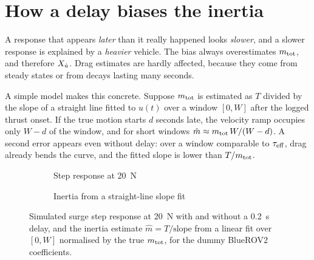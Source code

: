 \section{How a delay biases the inertia}

A response that appears \emph{later} than it really happened looks \emph{slower}, and a slower
response is explained by a \emph{heavier} vehicle. The bias always overestimates $m_\mathrm{tot}$, and
therefore $X_{\dot u}$. Drag estimates are hardly affected, because they come from steady states or
from decays lasting many seconds.

A simple model makes this concrete. Suppose $m_\mathrm{tot}$ is estimated as $T$ divided by the slope
of a straight line fitted to $u(t)$ over a window $[0, W]$ after the logged thrust onset. If
the true motion starts $d$ seconds late, the velocity ramp occupies only $W - d$ of the
window, and for short windows $\hat m \approx m_\mathrm{tot}\,W/(W-d)$. A second error appears even
without delay: over a window comparable to $\tau_\mathrm{eff}$, drag already bends the curve, and the
fitted slope is lower than $T/m_\mathrm{tot}$.

\begin{figure}[htbp]
\centering
\begin{subfigure}{0.48\textwidth}
\centering
{}
\caption{Step response at \qty{20}{\newton}}
\end{subfigure}\hfill
\begin{subfigure}{0.48\textwidth}
\centering
{}
\caption{Inertia from a straight-line slope fit}
\end{subfigure}
\caption{Simulated surge step response at \qty{20}{\newton} with and without a
\qty{0.2}{\second} delay, and the inertia estimate $\hat m = T/\text{slope}$ from a linear fit
over $[0, W]$ normalised by the true $m_\mathrm{tot}$, for the dummy BlueROV2 coefficients.}
\label{fig:delay}
\end{figure}
\FloatBarrier

